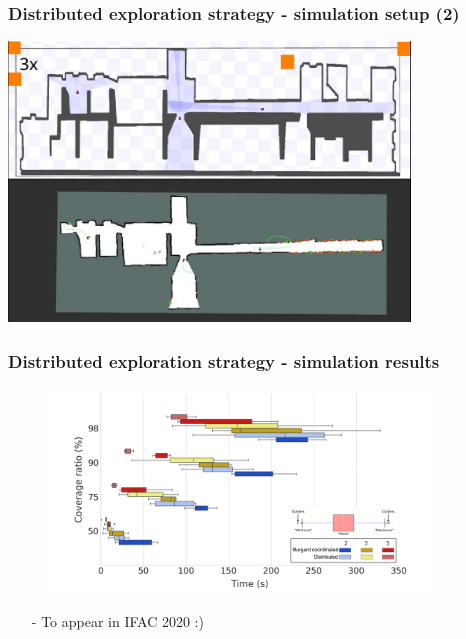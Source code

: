 \begin{frame}
	\frametitle{Distributed exploration strategy - simulation setup (2)}
		\centering
		\href{presentation_video.mp4}{\includegraphics[width=0.8\textwidth]{figures/title_screen.png}}
\end{frame}

\begin{frame}
	\frametitle{Distributed exploration strategy - simulation results}
	\begin{figure}
		\centering
		\includegraphics[width=0.9\textwidth]{figures/results_final}
	\end{figure}
	\begin{itemize}
		\item[-] To appear in IFAC 2020 :)
	\end{itemize}
	
\end{frame}


